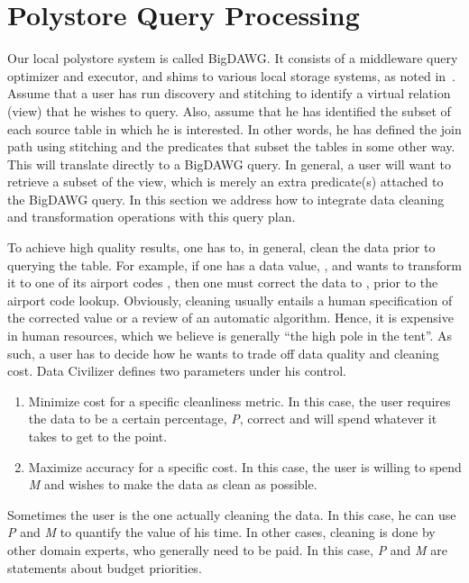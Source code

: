 \section{Polystore Query Processing}
\label{sec:curating}

Our local polystore system is called BigDAWG. It consists of a middleware query
optimizer and executor, and shims to various local storage systems, as noted
in~\cite{DBLP:journals/sigmod/DugganESBHKMMMZ15,
DBLP:journals/pvldb/ElmoreDSBCGHHKK15}.  Assume that a user has run discovery
and stitching to identify a virtual relation (view) that he wishes to query.
Also, assume that he has identified the subset of each source table in which he
is interested.  In other words, he has defined the join path using stitching and
the predicates that subset the tables in some other way.  This will translate
directly to a BigDAWG query.  In general, a user will want to retrieve a subset
of the view, which is merely an extra predicate(s) attached to the BigDAWG
query. In this section we address how to integrate data cleaning and
transformation operations with this query plan.

To achieve high quality results, one has to, in general, clean
the data prior to querying the table. For example, if one has a data value,
, and wants to transform it to one of its airport codes
, then one must correct the data to , prior
to the airport code lookup. Obviously, cleaning usually entails a human
specification of the corrected value or a review of an automatic algorithm.
Hence, it is expensive in human resources, which we believe is generally ``the
high pole in the tent''.  As such, a user has to decide how he wants to trade
off data quality and cleaning cost. Data Civilizer defines two parameters under
his control.

\begin{enumerate}
\item Minimize cost for a specific cleanliness metric. In this case, the
user requires the data to be a certain percentage, \emph{P}, correct and will spend
whatever it takes to get to the point.
\item Maximize accuracy for a specific cost. In this case, the user is
willing to spend \emph{M} and wishes to make the data as clean as possible.
\end{enumerate}

Sometimes the user is the one actually cleaning the data. In this case, he can
use \emph{P} and \emph{M} to quantify the value of his time. In other cases, cleaning is done
by other domain experts, who generally need to be paid. In this case, \emph{P}
and \emph{M} are statements about budget priorities.

